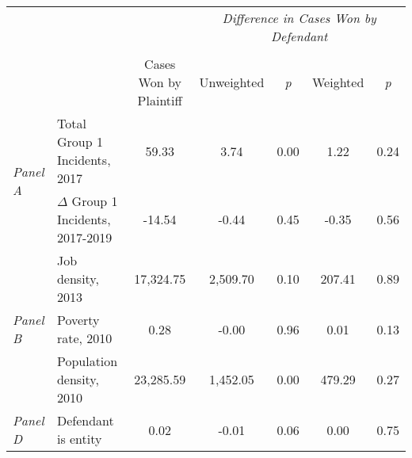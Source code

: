 \begin{tabular}{llccccc}
\toprule
 &  & \textit{} & \multicolumn{4}{c}{\textit{Difference in Cases Won by Defendant}} \\
\cline{4-7}
\\
 &  & Cases Won by Plaintiff & Unweighted & \emph{p} & Weighted & \emph{p} \\
\midrule
\multirow[c]{2}{3cm}{\textit{Panel A}} & Total Group 1 Incidents, 2017 & 59.33 & 3.74 & 0.00 & 1.22 & 0.24 \\
 & $\Delta$ Group 1 Incidents, 2017-2019 & -14.54 & -0.44 & 0.45 & -0.35 & 0.56 \\
\cline{1-7}
\multirow[c]{3}{3cm}{\textit{Panel B}} & Job density, 2013 & 17,324.75 & 2,509.70 & 0.10 & 207.41 & 0.89 \\
 & Poverty rate, 2010 & 0.28 & -0.00 & 0.96 & 0.01 & 0.13 \\
 & Population density, 2010 & 23,285.59 & 1,452.05 & 0.00 & 479.29 & 0.27 \\
\cline{1-7}
\textit{Panel D} & Defendant is entity & 0.02 & -0.01 & 0.06 & 0.00 & 0.75 \\
\cline{1-7}
\bottomrule
\end{tabular}
